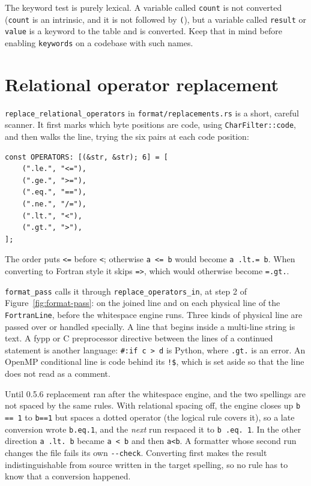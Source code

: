 \documentclass[11pt,a4paper,openany]{book}
\newcommand{\code}[1]{\texttt{\small #1}}
\newcommand{\file}[1]{\texttt{\small\color{accent}#1}}
\begin{document}
\begin{pitfall}
The keyword test is purely lexical. A variable called \code{count} is not
converted (\code{count} is an intrinsic, and it is not followed by
\code{(}), but a variable called \code{result} or \code{value} is a
keyword to the table and is converted. Keep that in mind before enabling
\code{keywords} on a codebase with such names.
\end{pitfall}

\section{Relational operator replacement}\label{sec:replacement}

\code{replace\_relational\_operators} in \file{format/replacements.rs} is a
short, careful scanner. It first marks which byte positions are code, using
\code{CharFilter::code}, and then walks the line, trying the six pairs at each
code position:

\begin{lstlisting}[style=rust]
const OPERATORS: [(&str, &str); 6] = [
    (".le.", "<="),
    (".ge.", ">="),
    (".eq.", "=="),
    (".ne.", "/="),
    (".lt.", "<"),
    (".gt.", ">"),
];
\end{lstlisting}

The order puts \code{<=} before \code{<}; otherwise \code{a <= b} would become
\code{a .lt.= b}. When converting to Fortran style it skips \code{=>}, which
would otherwise become \code{=.gt.}.

\code{format\_pass} calls it through \code{replace\_operators\_in}, at step 2
of Figure~\ref{fig:format-pass}: on the joined line and on each physical line
of the \code{FortranLine}, before the whitespace engine runs. Three kinds of
physical line are passed over or handled specially. A line that begins inside
a multi-line string is text. A fypp or C preprocessor directive between the
lines of a continued statement is another language: \code{\#:if c > d} is
Python, where \code{.gt.} is an error. An OpenMP conditional line is code
behind its \code{!\$}, which is set aside so that the line does not read as a
comment.

\begin{pitfall}
Until 0.5.6 replacement ran after the whitespace engine, and the two
spellings are not spaced by the same rules. With relational spacing off, the
engine closes up \code{b == 1} to \code{b==1} but spaces a dotted operator
(the logical rule covers it), so a late conversion wrote \code{b.eq.1}, and
the \emph{next} run respaced it to \code{b .eq. 1}. In the other direction
\code{a .lt. b} became \code{a < b} and then \code{a<b}. A formatter whose
second run changes the file fails its own \code{-{}-check}. Converting first
makes the result indistinguishable from source written in the target
spelling, so no rule has to know that a conversion happened.
\end{pitfall}
\end{document}
